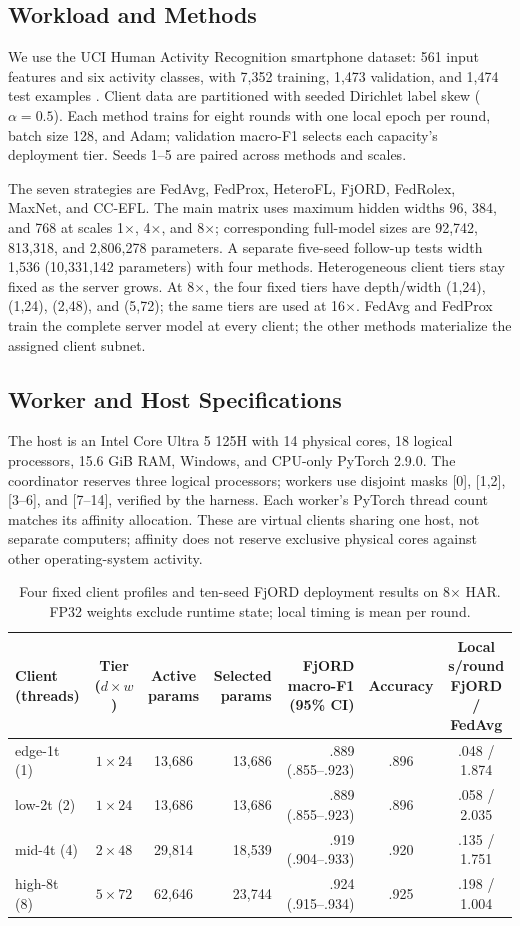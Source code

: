 \documentclass[conference]{IEEEtran}
\begin{document}
\subsection{Workload and Methods}
We use the UCI Human Activity Recognition smartphone dataset: 561 input features and six activity classes, with 7,352 training, 1,473 validation, and 1,474 test examples \cite{har}. Client data are partitioned with seeded Dirichlet label skew ($\alpha=0.5$). Each method trains for eight rounds with one local epoch per round, batch size 128, and Adam; validation macro-F1 selects each capacity's deployment tier. Seeds 1--5 are paired across methods and scales.

The seven strategies are FedAvg, FedProx, HeteroFL, FjORD, FedRolex, MaxNet, and CC-EFL. The main matrix uses maximum hidden widths 96, 384, and 768 at scales 1$\times$, 4$\times$, and 8$\times$; corresponding full-model sizes are 92,742, 813,318, and 2,806,278 parameters. A separate five-seed follow-up tests width 1,536 (10,331,142 parameters) with four methods. Heterogeneous client tiers stay fixed as the server grows. At 8$\times$, the four fixed tiers have depth/width (1,24), (1,24), (2,48), and (5,72); the same tiers are used at 16$\times$. FedAvg and FedProx train the complete server model at every client; the other methods materialize the assigned client subnet.

\subsection{Worker and Host Specifications}
The host is an Intel Core Ultra 5 125H with 14 physical cores, 18 logical processors, 15.6 GiB RAM, Windows, and CPU-only PyTorch 2.9.0. The coordinator reserves three logical processors; workers use disjoint masks [0], [1,2], [3--6], and [7--14], verified by the harness. Each worker's PyTorch thread count matches its affinity allocation. These are virtual clients sharing one host, not separate computers; affinity does not reserve exclusive physical cores against other operating-system activity.

\begin{table}[t]
\caption{Four fixed client profiles and ten-seed FjORD deployment results on 8$\times$ HAR. FP32 weights exclude runtime state; local timing is mean per round.}
\label{tab:devices}
\centering
\scriptsize
\begin{tabular}{@{}lccrrcc@{}}
\toprule
Client (threads) & Tier ($d\times w$) & Active params & Selected params & FjORD macro-F1 (95\% CI) & Accuracy & Local s/round FjORD / FedAvg \\
\midrule
edge-1t (1) & $1\times24$ & 13,686 & 13,686 & .889 (.855--.923) & .896 & .048 / 1.874 \\
low-2t (2) & $1\times24$ & 13,686 & 13,686 & .889 (.855--.923) & .896 & .058 / 2.035 \\
mid-4t (4) & $2\times48$ & 29,814 & 18,539 & .919 (.904--.933) & .920 & .135 / 1.751 \\
high-8t (8) & $5\times72$ & 62,646 & 23,744 & .924 (.915--.934) & .925 & .198 / 1.004 \\
\bottomrule
\end{tabular}
\end{table}
\end{document}

